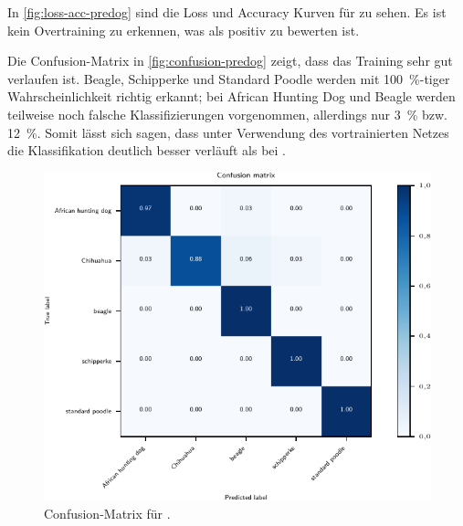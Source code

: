 In \autoref{fig:loss-acc-predog} sind die Loss und Accuracy Kurven für \PreDog{} zu sehen.
Es ist kein Overtraining zu erkennen, was als positiv zu bewerten ist.

Die Confusion-Matrix in \autoref{fig:confusion-predog} zeigt, dass das Training sehr gut
verlaufen ist. Beagle, Schipperke und Standard Poodle werden mit \SI{100}{\percent}-tiger
Wahrscheinlichkeit richtig erkannt; bei African Hunting Dog und Beagle werden teilweise
noch falsche Klassifizierungen vorgenommen, allerdings nur \SI{3}{\percent} bzw.
\SI{12}{\percent}. Somit lässt sich sagen, dass unter Verwendung des vortrainierten
Netzes die Klassifikation deutlich besser verläuft als bei \MiniDog{}.

\begin{figure}
  \centering
  \includegraphics[scale=0.8]{pics/ergebnisse/PreDogNN/confusion_matrix.pdf}
  \caption{Confusion-Matrix für \PreDog{}.}
  \label{fig:confusion-predog}
\end{figure}

\subsection{\RF}

